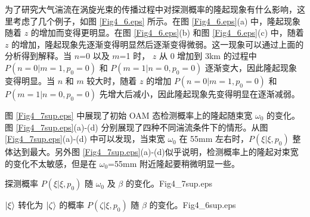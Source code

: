 \documentclass[master]{thesis-uestc}
\begin{document}
为了研究大气湍流在涡旋光束的传播过程中对探测概率的隆起现象有什么影响，这里考虑了几个例子，如图 \ref{Fig4_6.eps} 所示。在图 \ref{Fig4_6.eps}(a) 中，隆起现象随着 $z$ 的增加而变得更明显。在图 \ref{Fig4_6.eps}(b) 和图 \ref{Fig4_6.eps}(c) 中，随着 $z$ 的增加，隆起现象先逐渐变得明显然后逐渐变得微弱。这一现象可以通过上面的分析得到解释。当 $n$=0 以及 $m$=1 时， $z$ 从 0 增加到 3km 的过程中 $P(n=0|m=1, p_0=0)$ 和 $P(m=1|n=0, p_0=0)$ 逐渐变大，因此隆起现象变得明显。当 $n$ 和 $m$ 较大时，随着 $z$ 的增加 $P(n=0|m=1, p_0=0)$ 和 $P(m=1|n=0, p_0=0)$ 先增大后减小，因此隆起现象先变得明显在逐渐减弱。

图 \ref{Fig4_7sup.eps} 中展现了初始 OAM 态检测概率上的隆起随束宽 $\omega_0$ 的变化。图 \ref{Fig4_7sup.eps}(a)-(d) 分别展现了四种不同湍流条件下的情形。从图 \ref{Fig4_7sup.eps}(a)-(d) 中可以发现，当束宽 $\omega_0$ 在 55mm 左右时，$P(\xi|\xi,p_0)$ 整体达到最大。另外图 \ref{Fig4_7sup.eps}(a)-(d)似乎说明，检测概率上的隆起对束宽的变化不太敏感，但是在 $\omega_0$=55mm 附近隆起要稍微明显一些。

\begin{pics}[H]{ 探测概率 $P(\xi|\xi,p_0)$  随 $\omega_0$ 及 $\beta$ 的变化。}{Fig4_7sup.eps}
\end{pics}

\begin{pics}[H]{ $\ket{\xi}$ 转化为 $\ket{\zeta}$ 的概率 $P(\zeta|\xi,p_0)$ 随 $\beta$ 的变化。}{Fig4_6sup.eps}
\end{pics}
\end{document}
